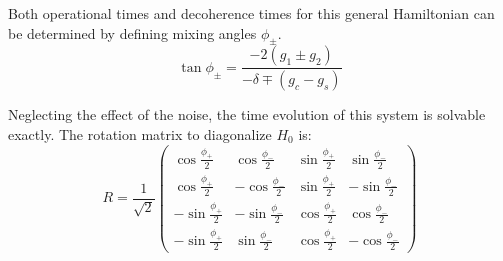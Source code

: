 Both operational times and decoherence times for this general Hamiltonian can be determined by defining mixing angles $\phi_\pm$.
\begin{equation}
    \tan\phi_\pm = \frac{-2(g_{1}\pm g_{2})}{-\delta\mp(g_c-g_s)}
\end{equation}

Neglecting the effect of the noise, the time evolution of this system is solvable exactly. The rotation matrix to diagonalize $H_0$ is:
\begin{equation}
    R=\frac{1}{\sqrt{2}}\left( \begin{array}{cccc}
            \cos\frac{\phi_+}{2}  & \cos\frac{\phi_-}{2}  & \sin\frac{\phi_+}{2} & \sin\frac{\phi_-}{2}  \\
            \cos\frac{\phi_+}{2}  & -\cos\frac{\phi_-}{2} & \sin\frac{\phi_+}{2} & -\sin\frac{\phi_-}{2} \\
            -\sin\frac{\phi_+}{2} & -\sin\frac{\phi_-}{2} & \cos\frac{\phi_+}{2} & \cos\frac{\phi_-}{2}  \\
            -\sin\frac{\phi_+}{2} & \sin\frac{\phi_-}{2}  & \cos\frac{\phi_+}{2} & -\cos\frac{\phi_-}{2}
        \end{array}\right)
\end{equation}

